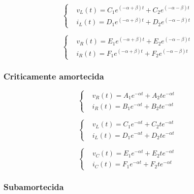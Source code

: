 \documentclass[12pt,fleqn]{book} %
\begin{document}
{\begin{equation}
\left\{\begin{aligned} & 
        v_L(t) = C_1e^{(-\alpha + \beta)t} + C_2e^{(-\alpha - \beta)t} \\&       
        i_L(t) = D_1e^{(-\alpha + \beta)t} + D_2e^{(-\alpha - \beta)t} 
    \end{aligned}\right.
\end{equation}

\begin{equation}
\left\{\begin{aligned} & 
        v_R(t) = E_1e^{(-\alpha + \beta)t} + E_2e^{(-\alpha - \beta)t} \\&       
        i_R(t) = F_1e^{(-\alpha + \beta)t} + F_2e^{(-\alpha - \beta)t} 
    \end{aligned}\right.
\end{equation}
            
            \subsubsection{Criticamente amortecida}

\begin{equation}
\left\{\begin{aligned} & 
        v_R(t) = A_1e^{-\alpha t} + A_2te^{-\alpha t} \\&       
        i_R(t) = B_1e^{-\alpha t} + B_2te^{-\alpha t} 
    \end{aligned}\right.
\end{equation}  

\begin{equation}
\left\{\begin{aligned} & 
        v_L(t) = C_1e^{-\alpha t} + C_2te^{-\alpha t} \\&       
        i_L(t) = D_1e^{-\alpha t} + D_2te^{-\alpha t} 
    \end{aligned}\right.
\end{equation}

\begin{equation}
\left\{\begin{aligned} & 
        v_C(t) = E_1e^{-\alpha t} + E_2te^{-\alpha t} \\&       
        i_C(t) = F_1e^{-\alpha t} + F_2te^{-\alpha t} 
    \end{aligned}\right.
\end{equation}          
            
            \subsubsection{Subamortecida}
            

}
\end{document}
